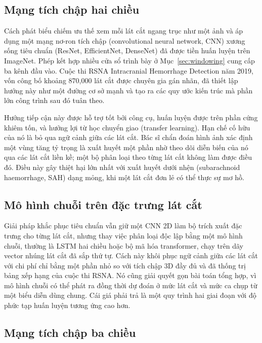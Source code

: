 \subsection{Mạng tích chập hai chiều}

Cách phát biểu chiếm ưu thế xem mỗi lát cắt ngang trục như một ảnh và áp dụng một
mạng nơ-ron tích chập (convolutional neural network, CNN) xương sống tiêu chuẩn
(ResNet, EfficientNet, DenseNet) đã được tiền huấn luyện trên ImageNet. Phép kết
hợp nhiều cửa sổ trình bày ở Mục~\ref{sec:windowing} cung cấp ba kênh đầu vào.
Cuộc thi RSNA Intracranial Hemorrhage Detection năm 2019, vốn công bố khoảng
870{,}000 lát cắt được chuyên gia gán nhãn, đã thiết lập hướng này như một đường
cơ sở mạnh và tạo ra các quy ước kiến trúc mà phần lớn công trình sau đó tuân
theo.

Hướng tiếp cận này được hỗ trợ tốt bởi công cụ, huấn luyện được trên phần cứng
khiêm tốn, và hưởng lợi từ học chuyển giao (transfer learning). Hạn chế cố hữu
của nó là bỏ qua ngữ cảnh giữa các lát cắt. Bác sĩ chẩn đoán hình ảnh xác định
một vùng tăng tỷ trọng là xuất huyết một phần nhờ theo dõi diễn biến của nó qua
các lát cắt liền kề; một bộ phân loại theo từng lát cắt không làm được điều đó.
Điều này gây thiệt hại lớn nhất với xuất huyết dưới nhện (subarachnoid
haemorrhage, SAH) dạng mỏng, khi một lát cắt đơn lẻ có thể thực sự mơ hồ.

\subsection{Mô hình chuỗi trên đặc trưng lát cắt}

Giải pháp khắc phục tiêu chuẩn vẫn giữ một CNN 2D làm bộ trích xuất đặc trưng cho
từng lát cắt, nhưng thay việc phân loại độc lập bằng một mô hình chuỗi, thường là
LSTM hai chiều hoặc bộ mã hóa transformer, chạy trên dãy vector nhúng lát cắt đã
sắp thứ tự. Cách này khôi phục ngữ cảnh giữa các lát cắt với chi phí chỉ bằng một
phần nhỏ so với tích chập 3D đầy đủ và đã thống trị bảng xếp hạng của cuộc thi
RSNA. Nó cũng giải quyết gọn bài toán tổng hợp, vì mô hình chuỗi có thể phát ra
đồng thời dự đoán ở mức lát cắt và mức ca chụp từ một biểu diễn dùng chung. Cái
giá phải trả là một quy trình hai giai đoạn với độ phức tạp huấn luyện tương ứng
cao hơn.

\subsection{Mạng tích chập ba chiều}

